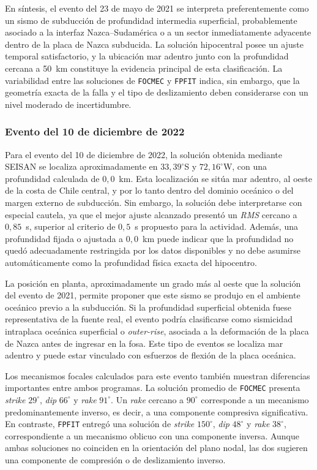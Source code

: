 \documentclass[a4paper,12pt]{article} %
\numberwithin{equation}{section} %
\numberwithin{figure}{section} %
\begin{document}
En síntesis, el evento del 23 de mayo de 2021 se interpreta preferentemente como un sismo de subducción de profundidad intermedia superficial, probablemente asociado a la interfaz Nazca--Sudamérica o a un sector inmediatamente adyacente dentro de la placa de Nazca subducida. La solución hipocentral posee un ajuste temporal satisfactorio, y la ubicación mar adentro junto con la profundidad cercana a 50~km constituye la evidencia principal de esta clasificación. La variabilidad entre las soluciones de \texttt{FOCMEC} y \texttt{FPFIT} indica, sin embargo, que la geometría exacta de la falla y el tipo de deslizamiento deben considerarse con un nivel moderado de incertidumbre.

\subsubsection{Evento del 10 de diciembre de 2022}

Para el evento del 10 de diciembre de 2022, la solución obtenida mediante SEISAN se localiza aproximadamente en $33{,}39^\circ$S y $72{,}16^\circ$W, con una profundidad calculada de $0{,}0$~km. Esta localización se sitúa mar adentro, al oeste de la costa de Chile central, y por lo tanto dentro del dominio oceánico o del margen externo de subducción. Sin embargo, la solución debe interpretarse con especial cautela, ya que el mejor ajuste alcanzado presentó un \textit{RMS} cercano a $0{,}85$~s, superior al criterio de $0{,}5$~s propuesto para la actividad. Además, una profundidad fijada o ajustada a $0{,}0$~km puede indicar que la profundidad no quedó adecuadamente restringida por los datos disponibles y no debe asumirse automáticamente como la profundidad física exacta del hipocentro.

La posición en planta, aproximadamente un grado más al oeste que la solución del evento de 2021, permite proponer que este sismo se produjo en el ambiente oceánico previo a la subducción. Si la profundidad superficial obtenida fuese representativa de la fuente real, el evento podría clasificarse como sismicidad intraplaca oceánica superficial o \emph{outer-rise}, asociada a la deformación de la placa de Nazca antes de ingresar en la fosa. Este tipo de eventos se localiza mar adentro y puede estar vinculado con esfuerzos de flexión de la placa oceánica.

Los mecanismos focales calculados para este evento también muestran diferencias importantes entre ambos programas. La solución promedio de \texttt{FOCMEC} presenta \textit{strike} $29^\circ$, \textit{dip} $66^\circ$ y \textit{rake} $91^\circ$. Un \textit{rake} cercano a $90^\circ$ corresponde a un mecanismo predominantemente inverso, es decir, a una componente compresiva significativa. En contraste, \texttt{FPFIT} entregó una solución de \textit{strike} $150^\circ$, \textit{dip} $48^\circ$ y \textit{rake} $38^\circ$, correspondiente a un mecanismo oblicuo con una componente inversa. Aunque ambas soluciones no coinciden en la orientación del plano nodal, las dos sugieren una componente de compresión o de deslizamiento inverso.
\end{document}
